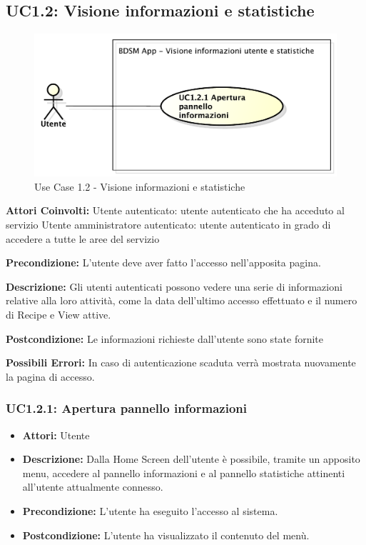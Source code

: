 \pagebreak

\subsection{UC1.2: Visione informazioni e statistiche}

\begin{figure}[htbp]
    \centering
    \centerline{\includegraphics[scale=0.6]{./images/UC1_2.pdf}}
    \caption{Use Case 1.2 - Visione informazioni e statistiche}
\end{figure}

	\textbf{Attori Coinvolti:}
Utente autenticato: utente autenticato che ha acceduto al servizio
Utente amministratore autenticato: utente autenticato in grado di accedere a tutte le aree del servizio

	\textbf{Precondizione:}
L'utente deve aver fatto l'accesso nell'apposita pagina.

	\textbf{Descrizione:}
Gli utenti autenticati possono vedere una serie di informazioni relative alla loro attività, come la data dell’ultimo accesso effettuato e il numero di Recipe e View attive.

	\textbf{Postcondizione:}
Le informazioni richieste dall'utente sono state fornite

	\textbf{Possibili Errori:}
In caso di autenticazione scaduta verrà mostrata nuovamente la pagina di accesso.

\subsubsection{UC1.2.1: Apertura pannello informazioni}

\begin{itemize}
    \item \textbf{Attori:} Utente
    \item \textbf{Descrizione:} Dalla Home Screen dell'utente è possibile, tramite un apposito menu, accedere al pannello informazioni e al pannello statistiche attinenti all'utente attualmente connesso.
    \item \textbf{Precondizione:} L'utente ha eseguito l'accesso al sistema.
    \item \textbf{Postcondizione:} L'utente ha visualizzato il contenuto del menù.
\end{itemize}

